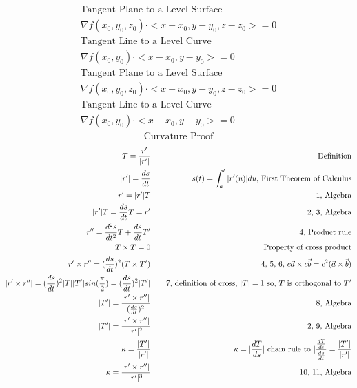 \documentclass{article}
\begin{document}
\begin{gather*}
    \text{Tangent Plane to a Level Surface}
    \\
    \nabla f(x_0,y_0,z_0)\cdot<x-x_0,y-y_0,z-z_0>=0
    \\
    \text{Tangent Line to a Level Curve}
    \\
    \nabla f(x_0,y_0)\cdot<x-x_0,y-y_0>=0
\end{gather*}
\begin{gather*}
 	   \text{Tangent Plane to a Level Surface}
	    \\
 	   \nabla f(x_0,y_0,z_0)\cdot<x-x_0,y-y_0,z-z_0>=0
 	   \\
 	   \text{Tangent Line to a Level Curve}
	    \\
	    \nabla f(x_0,y_0)\cdot<x-x_0,y-y_0>=0
\end{gather*}
\begin{gather*}
    \text{Curvature Proof}
\end{gather*}
\begin{alignat}{2}
\setcounter{equation}{0}
    T=\frac{r'}{|r'|}                           &\quad &\text{Definition}
    \\
    |r'|=\frac{ds}{dt}                          &\quad &s(t)=\int_a^t|r'(u)|du\text{, First Theorem of Calculus}
    \\
    r'=|r'|T                                    &\quad &\text{1, Algebra}
    \\
    |r'|T=\frac{ds}{dt}T=r'                     &\quad &\text{2, 3, Algebra}
    \\
    r''=\frac{d^2s}{dt^2}T+\frac{ds}{dt}T'      &\quad &\text{4, Product rule}
    \\
    T\times T=0                                 &\quad &\text{Property of cross product}
    \\
    r'\times r''=(\frac{ds}{dt})^2(T\times T')  &\quad &\text{4, 5, 6, } c\Vec{a}\times c\Vec{b}=c^2(\Vec{a}\times \Vec{b})
    \\
    |r'\times r''|=(\frac{ds}{dt})^2|T||T'|sin(\frac{\pi}{2})=(\frac{ds}{dt})^2|T'| &\quad &\text{7, definition of cross, } |T|=1\text{ so, } T\text{ is orthogonal to }T'
    \\
    |T'|=\frac{|r'\times r''|}{(\frac{ds}{dt})^2} &\quad &\text{8, Algebra}
    \\
    |T'|=\frac{|r'\times r''|}{|r'|^2}         &\quad &\text{2, 9, Algebra}
    \\
    \kappa=\frac{|T'|}{|r'|}                    &\quad &\kappa=|\frac{dT}{ds}|\text{ chain rule to }|\frac{\frac{dT}{dt}}{\frac{ds}{dt}}=\frac{|T'|}{|r'|}
    \\
    \kappa=\frac{|r'\times r''|}{|r'|^3}        &\quad &\text{10, 11, Algebra}
\end{alignat}
\end{document}
